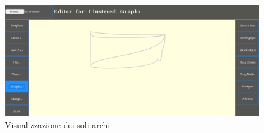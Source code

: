 {\begin{figure}[!htb]
	\begin{center}
		\includegraphics[width=1 \linewidth]{figure/edgesOnly}
	\end{center}
	\caption{Visualizzazione dei soli archi\label{fig:edgesOnly}}
\end{figure}
}